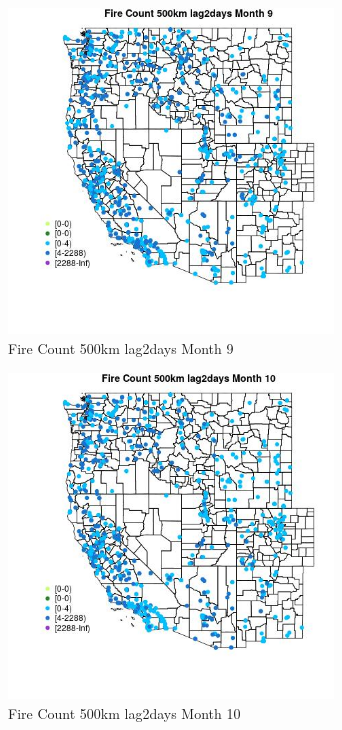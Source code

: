 \begin{figure} 
\centering  
\includegraphics[width=0.77\textwidth]{Code_Outputs/Report_ML_input_PM25_Step4_part_e_de_duplicated_aves_compiled_2019-05-21wNAs_MapObsMo9Fire_Count_500km_lag2days.jpg} 
\caption{\label{fig:Report_ML_input_PM25_Step4_part_e_de_duplicated_aves_compiled_2019-05-21wNAsMapObsMo9Fire_Count_500km_lag2days}Fire Count 500km lag2days Month 9} 
\end{figure} 
 

\begin{figure} 
\centering  
\includegraphics[width=0.77\textwidth]{Code_Outputs/Report_ML_input_PM25_Step4_part_e_de_duplicated_aves_compiled_2019-05-21wNAs_MapObsMo10Fire_Count_500km_lag2days.jpg} 
\caption{\label{fig:Report_ML_input_PM25_Step4_part_e_de_duplicated_aves_compiled_2019-05-21wNAsMapObsMo10Fire_Count_500km_lag2days}Fire Count 500km lag2days Month 10} 
\end{figure} 
 

